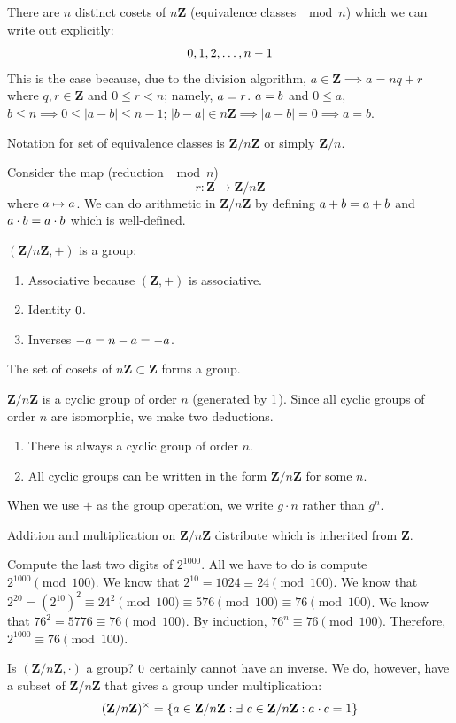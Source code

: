 \documentclass[11pt, oneside]{amsart}
\numberwithin{equation}{section}
\numberwithin{theorem}{section}
\theoremstyle{definition}
\let\bar\relax
\def\Z{\mathbf{Z}}
\begin{document}
There are $n$ distinct cosets of $n\Z $ (equivalence classes $\mod n$) which we can write out explicitly:
$$
\bar{0}, \bar{1}, \bar{2}, \hdots, \bar{n-1}
$$
This is the case because, due to the division algorithm, $a\in\Z\implies a =nq+r$ where  $q,r\in\Z$ and $0\leqslant r < n$; namely, $\bar{a}=\bar{r}$. $\bar{a}=\bar{b}$ and $0\leqslant a$, $b\leqslant n \implies 0\leqslant|a-b|\leqslant n-1$; $|b-a|\in n\Z \implies |a-b|=0\implies a=b$.

Notation for set of equivalence classes is $\Z/n\Z$ or simply $\Z/n$.

Consider the map (reduction $\mod n$) $${r} : \Z \to\Z/n\Z $$ where $a\mapsto \bar{a}$. We can do arithmetic in $\Z/n\Z $ by defining $\bar{a} +\bar{b} = \bar{a+b}$ and $\bar{a}\cdot{\bar{b}} = \bar{a\cdot b}$ which is well-defined.

$(\Z/n\Z,+)$ is a group:
\begin{enumerate}[label=(\roman*)]
\item Associative because $(\Z,+)$ is associative.
\item Identity $\bar{0}$.
\item Inverses $-\bar{a} =\bar{n-a}=\bar{-a}$.
\end{enumerate}

The set of cosets of $n\Z\subset{\Z}$ forms a group.

$\Z/n\Z$ is a cyclic group of order $n$ (generated by $\bar{1}$). Since all cyclic groups of order $n$ are isomorphic, we make two deductions.
\begin{enumerate}[label=(\roman*)]
\item There is always a cyclic group of order $n$.
\item All cyclic groups can be written in the form $\Z/n\Z$ for some $n$.
\end{enumerate}
When we use $+$ as the group operation, we write $g\cdot n$ rather than $g^n$.

Addition and multiplication on $\Z/n\Z$ distribute which is inherited from $\Z$.

Compute the last two digits of $2^{1000}$. All we have to do is compute $2^{1000}\pmod{100}$. We know that $2^{10} = 1024\equiv 24 \pmod{100}$. We know that $2^{20}=(2^{10})^2\equiv24^2\pmod{100} \equiv 576\pmod{100}  \equiv 76\pmod{100}$. We know that $76^2 = 5776 \equiv 76\pmod{100}$. By induction, $76^n\equiv 76\pmod{100}$. Therefore, $2^{1000} \equiv 76\pmod{100}$.

Is $(\Z/n\Z, \cdot)$ a group? $\bar{0}$ certainly cannot have an inverse. We do, however, have a subset of $\Z/n\Z$ that gives a group under multiplication:
$$
(\Z/n\Z)^\times = \{\bar{a} \in\Z/n\Z : \exists\ \bar{c} \in \Z/n\Z : \bar{a} \cdot \bar{c} = \bar{1}\}
$$
\end{document}
